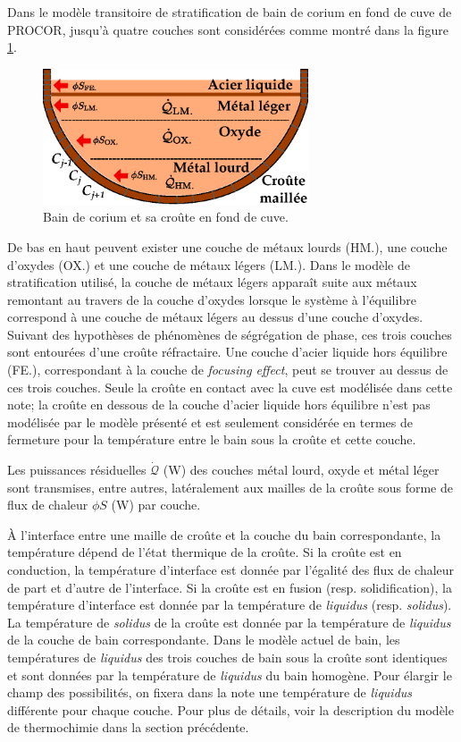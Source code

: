 Dans le modèle transitoire de stratification de bain de corium en fond de cuve de PROCOR, jusqu'à quatre couches sont considérées comme montré dans la figure \ref{fig:bain_corium_croute}. 
\begin{figure}
\centering
\includegraphics[width=0.7\textwidth, keepaspectratio=true]{Figures/bain_corium_croute.eps}
\caption{Bain de corium et sa croûte en fond de cuve.}
\label{fig:bain_corium_croute}
\end{figure}
De bas en haut peuvent exister une couche de métaux lourds (HM.), une couche d'oxydes (OX.) et une couche de métaux légers (LM.). Dans le modèle de stratification utilisé, la couche de métaux légers apparaît suite aux métaux remontant au travers de la couche d'oxydes lorsque le système à l'équilibre correspond à une couche de métaux légers au dessus d'une couche d'oxydes. Suivant des hypothèses de phénomènes de ségrégation de phase, ces trois couches sont entourées d'une croûte réfractaire. Une couche d'acier liquide hors équilibre (FE.), correspondant à la couche de \textit{focusing effect}, peut se trouver au dessus de ces trois couches. Seule la croûte en contact avec la cuve est modélisée dans cette note; la croûte en dessous de la couche d'acier liquide hors équilibre n'est pas modélisée par le modèle présenté et est seulement considérée en termes de fermeture pour la température entre le bain sous la croûte et cette couche. 

Les puissances résiduelles $\dot{\mathcal{Q}}$ (W) des couches métal lourd, oxyde et métal léger sont transmises, entre autres, latéralement aux mailles de la croûte sous forme de flux de chaleur $\phi S$ (W) par couche.

À l'interface entre une maille de croûte et la couche du bain correspondante, la température dépend de l'état thermique de la croûte. Si la croûte est en conduction, la température d'interface est donnée par l'égalité des flux de chaleur de part et d'autre de l'interface. Si la croûte est en fusion (resp. solidification), la température d'interface est donnée par la température de \textit{liquidus} (resp. \textit{solidus}). La température de \textit{solidus} de la croûte est donnée par la température de \textit{liquidus} de la couche de bain correspondante. Dans le modèle actuel de bain, les températures de \textit{liquidus} des trois couches de bain sous la croûte sont identiques et sont données par la température de \textit{liquidus} du bain homogène. Pour élargir le champ des possibilités, on fixera dans la note une température de \textit{liquidus} différente pour chaque couche. Pour plus de détails, voir la description du modèle de thermochimie dans la section précédente. 

